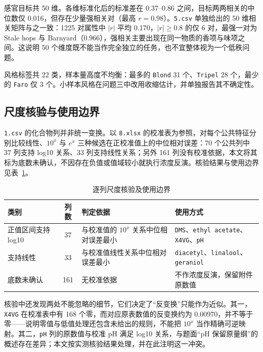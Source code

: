 \documentclass[UTF8,a4paper,zihao=-4]{ctexart}
\numberwithin{figure}{section}
\numberwithin{table}{section}
\numberwithin{equation}{section}
\newcommand{\file}[1]{\texttt{#1}}
\begin{document}
感官目标共 50 维。各维标准化后的标准差在 0.37--0.86 之间，目标两两相关的中位数仅 0.016，但存在少量强相关对（最高 $r=0.98$）。\file{5.csv} 单独给出的 50 维相关矩阵与之一致：1225 对属性中 $|r|$ 平均 0.170，$|r|\ge0.8$ 的仅 6 对，最强一对为 Stale hops 与 Barnyard（0.966），强相关主要出现在同一物质的香项与味项之间。这说明 50 个维度既不能当作完全独立的任务，也不宜整体视为一个低秩问题。

风格标签共 22 类，样本量高度不均衡：最多的 \file{Blond} 31 个、\file{Tripel} 28 个，最少的 \file{Faro} 仅 3 个。小样本风格在问题三中改用收缩估计，并单独报告其不确定性。

\subsection{尺度核验与使用边界}
\label{sec:scale}

\file{1.csv} 的化合物列并非统一变换。以 \file{8.xlsx} 的校准表为参照，对每个公共特征分别比较线性、$10^{x}$ 与 $e^{x}$ 三种候选在正校准值上的中位相对误差：70 个公共列中 37 列支持 log10 关系、33 列支持线性关系；另外 161 列没有校准依据，本文将其标为底数未确认，不因存在负值或值域较小就执行浓度反演。核验结果与使用边界见表~\ref{tab:transform}。

\begin{table}[H]
  \centering
  \caption{逐列尺度核验及使用边界}
  \label{tab:transform}
  \small
  \begin{tabularx}{\textwidth}{@{}l c >{\hsize=1.15\hsize\raggedright\arraybackslash}X >{\hsize=0.85\hsize\raggedright\arraybackslash}X@{}}
    \toprule
    类别 & 列数 & 判定依据 & 使用方式 \\
    \midrule
    正值区间支持 log10 & 37 & 与校准值的 $10^{x}$ 关系中位相对误差最小 & \file{DMS}、\file{ethyl acetate}、\file{X4VG}、\file{pH} \\
    支持线性 & 33 & 与校准值线性关系中位相对误差最小 & \file{diacetyl}、\file{linalool}、\file{geraniol} \\
    底数未确认 & 161 & 无校准依据 & 不作浓度反演，保留附件原数值 \\
    \bottomrule
  \end{tabularx}
\end{table}

核验中还发现两处不能忽略的细节，它们决定了“反变换”只能作为近似。其一，\file{X4VG} 在校准表中有 168 个零，而对应原表数值的反变换约为 0.00970，并不等于零——说明零值与低值处理还包含未给出的规则，不能把 $10^{x}$ 当作精确可逆映射。其二，\file{pH} 列的原数值与校准 pH 满足 log10 关系，与题面“pH 保留原量纲”的概述存在差异；本文按实测核验结果处理，并在此注明这一冲突。
\end{document}

